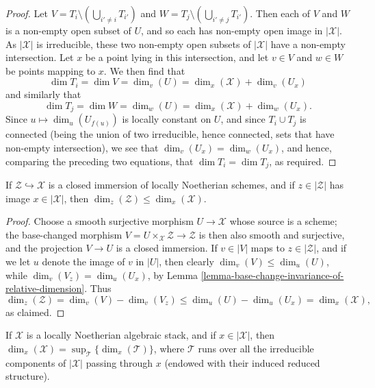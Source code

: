 \begin{proof}
\medskip\noindent
Let $V = T_i \setminus (\bigcup_{i' \neq i} T_{i'})$
and $W = T_j \setminus (\bigcup_{i' \neq j} T_{i'})$.
Then each of $V$ and $W$ is a non-empty open subset of $U$,
and so each has non-empty open image in $|\mathcal{X}|$.  As $|\mathcal{X}|$ is
irreducible,
these two non-empty open subsets of $|\mathcal{X}|$ have a non-empty
intersection.
Let $x$ be a point lying in this intersection, and let $v \in V$ and
$w\in W$ be points mapping to $x$.
We then find that
$$
\dim T_i = \dim V = \dim_v (U) = \dim_x (\mathcal{X}) + \dim_v (U_x)
$$
and similarly that
$$
\dim T_j = \dim W = \dim_w (U) = \dim_x (\mathcal{X}) + \dim_w (U_x).
$$
Since $u \mapsto \dim_u (U_{f(u)})$ is locally constant on $U$,
and since $T_i \cup T_j$ is connected (being the union of two irreducible,
hence connected, sets that have non-empty intersection),
we see that $\dim_v (U_x) = \dim_w(U_x)$,
and hence, comparing the preceding two equations,
that $\dim T_i = \dim T_j$, as required.
\end{proof}

\begin{lemma}
\label{lemma-closed-immersions}
If $\mathcal{Z} \hookrightarrow \mathcal{X}$ is a closed immersion
of locally Noetherian schemes,
and if $z \in |\mathcal{Z}|$ has image $x \in |\mathcal{X}|$,
then $\dim_z (\mathcal{Z}) \leq \dim_x(\mathcal{X})$.
\end{lemma}

\begin{proof}
Choose a smooth surjective morphism
$U\to \mathcal{X}$ whose source is a scheme;
the base-changed morphism
$V = U\times_{\mathcal{X}} \mathcal{Z} \to \mathcal{Z}$
is then also smooth and surjective, and the projection
$V \to U$ is a closed immersion.
If $v \in |V|$ maps to $z \in |\mathcal{Z}|$, and
if we let $u$ denote the image of $v$ in $|U|$,
then clearly
$\dim_v(V) \leq \dim_u(U)$,
while
$\dim_v (V_z) = \dim_u(U_x)$,
by Lemma \ref{lemma-base-change-invariance-of-relative-dimension}.
Thus
$$
\dim_z(\mathcal{Z})  = \dim_v(V) - \dim_v(V_z)
\leq \dim_u(U) - \dim_u(U_x) = \dim_x(\mathcal{X}),
$$
as claimed.
\end{proof}

\begin{lemma}
\label{lemma-dimension-via-components}
If $\mathcal{X}$ is a locally Noetherian algebraic stack, and if
$x \in |\mathcal{X}|$,
then $\dim_x(\mathcal{X}) = \sup_{\mathcal{T}} \{ \dim_x(\mathcal{T}) \} $,
where $\mathcal{T}$ runs over all the irreducible components
of $|\mathcal{X}|$ passing through $x$ (endowed with their
induced reduced structure).
\end{lemma}

